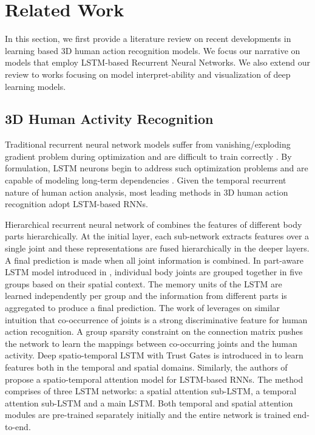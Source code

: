 \documentclass[10pt,twocolumn,letterpaper]{article}
\begin{document}
\section{Related Work}
In this section, we first provide a literature review on recent developments in learning based 3D human action recognition models. We focus our narrative on models that employ LSTM-based Recurrent Neural Networks. We also extend our review to works focusing on model interpret-ability and  visualization of deep learning models.

\subsection{3D Human Activity Recognition}
Traditional recurrent neural network models suffer from vanishing/exploding gradient problem during optimization and are difficult to train correctly \cite{difficulty,bilstm}. By formulation, LSTM neurons begin to address such optimization problems and are capable of modeling long-term dependencies \cite{lstm,lstm2,bilstm}. Given the temporal recurrent nature of human action analysis, most leading methods in 3D human action recognition adopt LSTM-based RNNs. 

Hierarchical recurrent neural network of \cite{du2015} combines the features of different body parts hierarchically. At the initial layer, each sub-network extracts features over a single joint and these representations are fused hierarchically in the deeper layers. A final prediction is made when all joint information is combined. In part-aware LSTM model introduced in \cite{nturgdb2016}, individual body joints are grouped together in five groups based on their spatial context. The memory units of the LSTM are learned independently per group and the information from different parts is aggregated to produce a final prediction. The work of \cite{zhu2016} leverages on similar intuition that co-occurrence of joints is a strong discriminative feature for human action recognition. A group sparsity constraint on the connection matrix pushes the network to learn the mappings between co-occurring joints and the human activity. Deep spatio-temporal LSTM with Trust Gates is introduced in \cite{Liu2016} to learn features both in the temporal and spatial domains. Similarly, the authors of \cite{Song2017} propose a spatio-temporal attention model for LSTM-based RNNs. The method comprises of three LSTM networks: a spatial attention sub-LSTM, a temporal attention sub-LSTM and a main LSTM. Both temporal and spatial attention modules are pre-trained separately initially and the entire network is trained end-to-end. 
\end{document}
